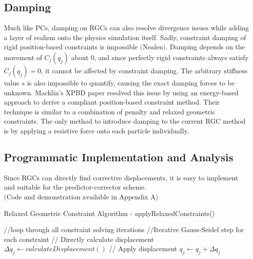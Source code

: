 \documentclass[12pt, letterpaper]{article}
\begin{document}
\subsection{Damping}
\hspace{\parindent} Much like PCs, damping on RGCs can also resolve divergence issues while adding a layer of realism onto the physics simulation itself. Sadly, constraint damping of rigid position-based constraints is impossible $\text{(Nealen)}$. Damping depends on the movement of $C_j(q_j)$ about 0, and since perfectly rigid constraints always satisfy $C_j(q_j) = 0$, it cannot be affected by constraint damping. The arbitrary stiffness value $s$ is also impossible to quantify, causing the exact damping forces to be unknown. Macklin’s XPBD paper resolved this issue by using an energy-based approach to derive a compliant position-based constraint method. Their technique is similar to a combination of penalty and relaxed geometric constraints. The only method to introduce damping to the current RGC method is by applying a resistive force onto each particle individually.

\subsection{Programmatic Implementation and Analysis}
\hspace{\parindent} Since RGCs can directly find corrective displacements, it is easy to implement and suitable for the predictor-corrector scheme. $\text{(Code and demonstration available in Appendix A)}$
\begin{algorithm}[H]
\caption{Relaxed Geometric Constraint Algorithm - applyRelaxedConstraints()}
\begin{algorithmic}[1]
\STATE //loop through all constraint solving iterations
    \STATE //Iterative Gauss-Seidel step for each constraint
        \STATE // Directly calculate displacement
        \STATE $\Delta q_j \leftarrow calculateDisplacement()$
        \STATE // Apply displacement
        \STATE $q_j \leftarrow q_j + \Delta q_j$
    \ENDFOR
\ENDFOR
\end{algorithmic}
\end{algorithm}
\end{document}
